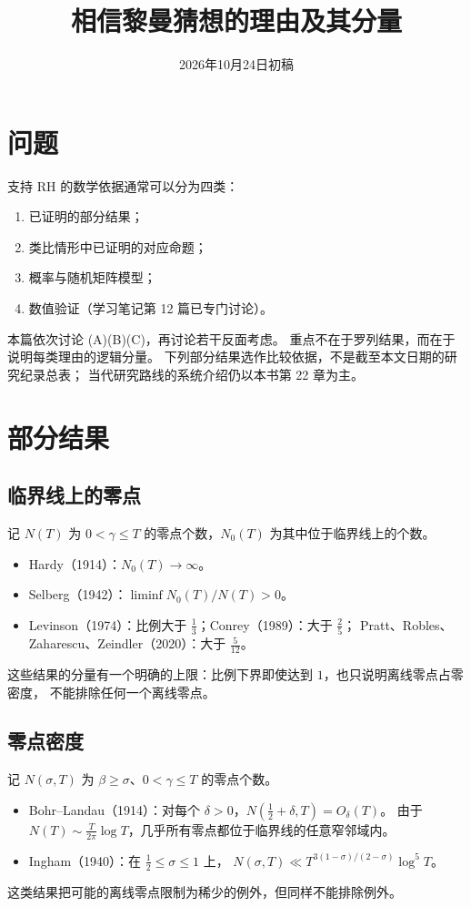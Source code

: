 \documentclass[11pt]{article}
\date{2026年10月24日初稿}
\title{相信黎曼猜想的理由及其分量}
\begin{document}
\maketitle

\par\medskip

\section{问题}
支持 RH 的数学依据通常可以分为四类：
\begin{enumerate}
 \item[(A)] 已证明的部分结果；
 \item[(B)] 类比情形中已证明的对应命题；
 \item[(C)] 概率与随机矩阵模型；
 \item[(D)] 数值验证（学习笔记第 12 篇已专门讨论）。
\end{enumerate}
本篇依次讨论 (A)(B)(C)，再讨论若干反面考虑。
重点不在于罗列结果，而在于说明每类理由的逻辑分量。
下列部分结果选作比较依据，不是截至本文日期的研究纪录总表；
当代研究路线的系统介绍仍以本书第 22 章为主。

\section{部分结果}
\subsection{临界线上的零点}
记 $N(T)$ 为 $0<\gamma\le T$ 的零点个数，$N_0(T)$ 为其中位于临界线上的个数。
\begin{itemize}
 \item Hardy（1914）：$N_0(T)\to\infty$。
 \item Selberg（1942）：$\liminf N_0(T)/N(T)>0$。
 \item Levinson（1974）：比例大于 $\tfrac13$；Conrey（1989）：大于 $\tfrac25$；
 Pratt、Robles、Zaharescu、Zeindler（2020）：大于 $\tfrac5{12}$。
\end{itemize}
这些结果的分量有一个明确的上限：比例下界即使达到 $1$，也只说明离线零点占零密度，
不能排除任何一个离线零点。

\subsection{零点密度}
记 $N(\sigma,T)$ 为 $\beta\ge\sigma$、$0<\gamma\le T$ 的零点个数。
\begin{itemize}
 \item Bohr--Landau（1914）：对每个 $\delta>0$，$N(\tfrac12+\delta,T)=O_\delta(T)$。
 由于 $N(T)\sim\tfrac{T}{2\pi}\log T$，几乎所有零点都位于临界线的任意窄邻域内。
 \item Ingham（1940）：在 $\tfrac12\le\sigma\le1$ 上，
 $N(\sigma,T)\ll T^{3(1-\sigma)/(2-\sigma)}\log^5T$。
\end{itemize}
这类结果把可能的离线零点限制为稀少的例外，但同样不能排除例外。
\end{document}
